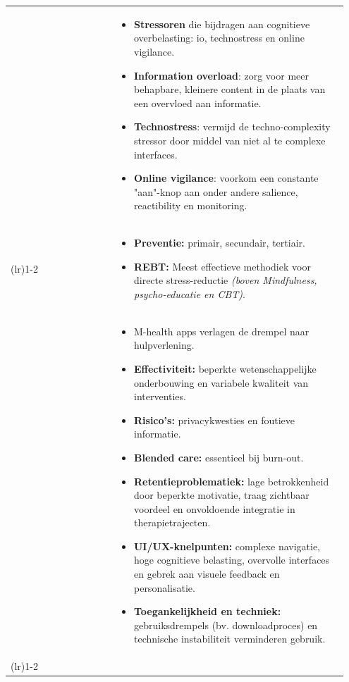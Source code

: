 {\begin{longtable}{>{\raggedright\arraybackslash}p{0.30\linewidth} >{\raggedright\arraybackslash}p{0.65\linewidth}}
        \nameref{sec:digitalisering-cognitief} &
        \begin{itemize}[nosep, leftmargin=*]
            \item \textbf{Stressoren} die bijdragen aan cognitieve overbelasting: \acrshort{io}, technostress en online vigilance.
            \item \textbf{Information overload}: zorg voor meer behapbare, kleinere content in de plaats van een overvloed aan informatie.
            \item \textbf{Technostress}: vermijd de techno-complexity stressor door middel van niet al te complexe interfaces.
            \item \textbf{Online vigilance}: voorkom een constante "aan"-knop aan onder andere salience, reactibility en monitoring.
        \end{itemize} \\
        \addlinespace[8pt] \cmidrule(lr){1-2} \addlinespace[6pt]
        
        \nameref{sec:preventie-behandeling} &
        \begin{itemize}[nosep, leftmargin=*]
            \item \textbf{Preventie:} primair, secundair, tertiair.
            \item \textbf{REBT:} Meest effectieve methodiek voor directe stress-reductie \textit{(boven Mindfulness, psycho-educatie en CBT)}.
        \end{itemize} \\
        
        \nameref{sec:digitale-interventies} &
        \begin{itemize}[nosep, leftmargin=*]
            \item M-health apps verlagen de drempel naar hulpverlening.
            \item \textbf{Effectiviteit:} beperkte wetenschappelijke onderbouwing en variabele kwaliteit van interventies.
            \item \textbf{Risico’s:} privacykwesties en foutieve informatie.
            \item \textbf{Blended care:} essentieel bij burn-out.
            \item \textbf{Retentieproblematiek:} lage betrokkenheid door beperkte motivatie, traag zichtbaar voordeel en onvoldoende integratie in therapietrajecten.
            \item \textbf{UI/UX-knelpunten:} complexe navigatie, hoge cognitieve belasting, overvolle interfaces en gebrek aan visuele feedback en personalisatie.
            \item \textbf{Toegankelijkheid en techniek:} gebruiksdrempels (bv. downloadproces) en technische instabiliteit verminderen gebruik.
        \end{itemize} \\
        \addlinespace[8pt] \cmidrule(lr){1-2} \addlinespace[6pt]
        

\end{longtable}}
